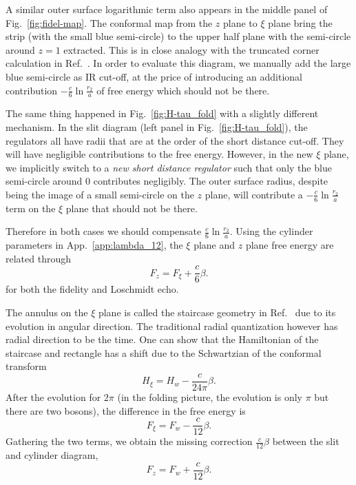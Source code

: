 A similar outer surface logarithmic term also appears in the middle panel of Fig.~\ref{fig:fidel-map}. The conformal map from the $z$ plane to $\xi$ plane bring the strip (with the small blue semi-circle) to the upper half plane with the semi-circle around $z = 1$ extracted. This is in close analogy with the truncated corner calculation in Ref.~. In order to evaluate this diagram, we manually add the large blue semi-circle as IR cut-off, at the price of introducing an additional contribution  $-\frac{c}{6} \ln \frac{r_2}{a}$ of free energy which should not be there. 

The same thing happened in Fig.~\ref{fig:H-tau_fold} with a slightly different mechanism. In the slit diagram (left panel in Fig.~\ref{fig:H-tau_fold}), the regulators all have radii that are at the order of the short distance cut-off. They will have negligible contributions to the free energy. However, in the new $\xi$ plane, we implicitly switch to a {\it new short distance regulator} such that only the blue semi-circle around $0$ contributes negligibly. The outer surface radius, despite being the image of a small semi-circle on the $z$ plane, will contribute a $-\frac{c}{6} \ln \frac{r_2}{a}$ term on the $\xi$ plane that should not be there. 

Therefore in both cases we should compensate $\frac{c}{6} \ln \frac{r_2}{a}$. Using the cylinder parameters in App.~\ref{app:lambda_12}, the $\xi$ plane and $z$ plane free energy are related through
\begin{equation}
F_{z} = F_{\xi} + \frac{c}{6} \beta .
\end{equation}
for both the fidelity and Loschmidt echo. 

The annulus on the $\xi$ plane is called the staircase geometry in Ref.~ due to its evolution in angular direction. The traditional radial quantization however has radial direction to be the time. One can show that the Hamiltonian of the staircase and rectangle has a shift due to the Schwartzian\cite{cardy_finite-size_1988} of the conformal transform
\begin{equation}
H_{\xi} = H_{w} - \frac{c}{24\pi} \beta .
\end{equation}
After the evolution for $2\pi$ (in the folding picture, the evolution is only $\pi$ but there are two bosons), the difference in the free energy is
\begin{equation}
F_{\xi} = F_{w} - \frac{c}{12} \beta .
\end{equation}
Gathering the two terms, we obtain the missing correction $\frac{c}{12} \beta$ between the slit and cylinder diagram, 
\begin{equation}
F_{z} = F_w + \frac{c}{12}\beta.
\end{equation}


